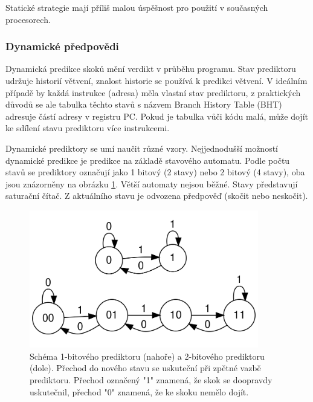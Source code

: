 Statické strategie mají příliš malou úspěšnost pro použití v současných procesorech.

\subsubsection{Dynamické předpovědi}

Dynamická predikce skoků mění verdikt v průběhu programu.
Stav prediktoru udržuje historií větvení, znalost historie se používá k predikci větvení.
V ideálním případě by každá instrukce (adresa) měla vlastní stav prediktoru, z praktických důvodů se ale tabulka těchto stavů s názvem Branch History Table (BHT) adresuje částí adresy v registru PC.
Pokud je tabulka vůči kódu malá, může dojít ke sdílení stavu prediktoru více instrukcemi. \cite{OrganizationAndDesign}

Dynamické prediktory se umí naučit různé vzory.
Nejjednodušší možností dynamické predikce je predikce na základě stavového automatu.
Podle počtu stavů se prediktory označují jako 1 bitový (2 stavy) nebo 2 bitový (4 stavy), oba jsou znázorněny na obrázku \ref{fsmpredictor}.
Větší automaty nejsou běžné.
Stavy představují saturační čítač.
Z aktuálního stavu je odvozena předpověď (skočit nebo neskočit).

\begin{figure}[ht]\centering
	
	
	
  \includegraphics[width=10cm]{obrazky-figures/fsmpredictors.png}
  \caption{Schéma 1-bitového prediktoru (nahoře) a 2-bitového prediktoru (dole).
  Přechod do nového stavu se uskuteční při zpětné vazbě prediktoru. Přechod označený "1" znamená, že skok se doopravdy uskutečnil, přechod "0" znamená, že ke skoku nemělo dojít. }
  \label{fsmpredictor}
\end{figure}


